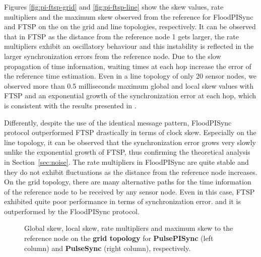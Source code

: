 \documentclass[english,a4paper,10pt,final]{article}
\numberwithin{equation}{section}
\numberwithin{figure}{section}
\begin{document}
Figures \ref{fig:pi-ftsp-grid} and \ref{fig:pi-ftsp-line} show the skew values, rate multipliers and the maximum skew observed from the reference for FloodPISync and FTSP on the on the  grid  and line topologies, respectively. It can be observed that in FTSP as the distance from the reference node 1 gets larger, the rate multipliers exhibit an oscillatory behaviour and this instability is reflected in the larger synchronization errors from the reference node. Due to the slow propagation of time information, waiting times at each hop increase the error of the reference time estimation. Even in a line topology of only 20 sensor nodes, we observed more than 0.5 milliseconds maximum global and local skew values with FTSP and an exponential growth of the synchronization error at each hop, which is consistent with the results presented in \cite{Lenzen2009Optimal}.

Differently, despite the use of the identical message pattern, FloodPISync protocol outperformed FTSP drastically in terms of clock skew. Especially on the line topology, it can be observed that the synchronization error grows very slowly unlike the exponential growth of FTSP, thus confirming the theoretical analysis in Section~\ref{sec:noise}. The rate multipliers in FloodPISync are quite stable and they do not exhibit fluctuations as the distance from the reference node increases. On the grid topology, there are many alternative paths for the time information of the reference node to be received by any sensor node. Even in this case, FTSP exhibited quite poor performance in terms of synchronization error. and it is outperformed by the FloodPISync protocol.

\begin{figure*}

\center





\caption{\label{fig:pi-pulseSync-grid} Global skew, local skew, rate multipliers and maximum skew to the reference node on the {\bf grid topology} for \textbf{PulsePISync} (left column) and \textbf{PulseSync} (right column), respectively.}
\end{figure*}
\end{document}
